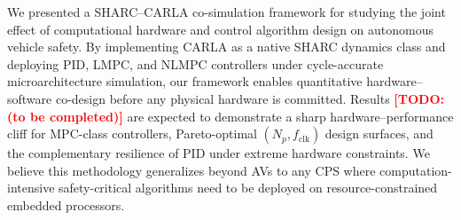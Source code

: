 \documentclass[conference]{IEEEtran}
\newcommand{\TODO}[1]{\textcolor{red}{\textbf{[TODO: #1]}}}
\begin{document}
We presented a SHARC--CARLA co-simulation framework for studying the
joint effect of computational hardware and control algorithm design on
autonomous vehicle safety.  By implementing CARLA as a native SHARC
dynamics class and deploying PID, LMPC, and NLMPC controllers under
cycle-accurate microarchitecture simulation, our framework enables
quantitative hardware--software co-design before any physical hardware
is committed.  Results \TODO{(to be completed)} are expected to
demonstrate a sharp hardware--performance cliff for MPC-class
controllers, Pareto-optimal $(N_p, f_\text{clk})$ design surfaces, and
the complementary resilience of PID under extreme hardware constraints.
We believe this methodology generalizes beyond AVs to any CPS where
computation-intensive safety-critical algorithms need to be deployed on
resource-constrained embedded processors.



\end{document}
